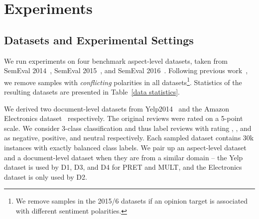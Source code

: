 \documentclass[11pt,a4paper]{article}
\begin{document}
\begin{table*}[t]
\centering
\small
{}
\caption{PRET with different transferred layers. Averaged results over 5 runs are reported.}\label{ablation test}
\end{table*}

\section{Experiments}
\subsection{Datasets and Experimental Settings}
We run experiments on four benchmark aspect-level datasets, taken from SemEval 2014~\cite{Pontiki:14}, SemEval 2015~\cite{Pontiki:15}, and SemEval 2016~\cite{Pontiki:16}. Following previous work~\cite{Tang:16b,Wang:16}, we remove samples with \emph{conflicting} polarities in all datasets\footnote{We remove samples in the 2015/6 datasets if an opinion target is associated with different sentiment polarities.}. Statistics of the resulting datasets are presented in Table~\ref{data statistics}.

We derived two document-level datasets from Yelp2014~\cite{tang:15} and the Amazon Electronics dataset~\cite{Mcauley:15} respectively. The original reviews were rated on a 5-point scale. We consider 3-class classification and thus label reviews with rating , , and  as negative, positive, and neutral respectively. Each sampled dataset contains 30k instances with exactly balanced class labels. We pair up an aspect-level dataset and a document-level dataset when they are from a similar domain -- the Yelp dataset is used by D1, D3, and D4 for PRET and MULT, and the Electronics dataset is only used by D2. 
\end{document}
